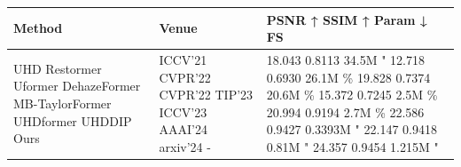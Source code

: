 \begin{tabular}{lll}
\toprule
Method & Venue & PSNR ↑ SSIM ↑ Param ↓ FS \\
\midrule
UHD Restormer Uformer DehazeFormer MB-TaylorFormer UHDformer UHDDIP Ours & ICCV’21 CVPR’22 CVPR’22 TIP’23 ICCV’23 AAAI’24 arxiv’24 - & 18.043 0.8113 34.5M " 12.718 0.6930 26.1M \% 19.828 0.7374 20.6M \% 15.372 0.7245 2.5M \% 20.994 0.9194 2.7M \% 22.586 0.9427 0.3393M " 22.147 0.9418 0.81M " 24.357 0.9454 1.215M " \\
\bottomrule
\end{tabular}
